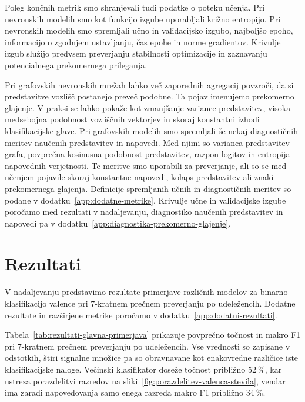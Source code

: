 Poleg končnih metrik smo shranjevali tudi podatke o poteku učenja.
Pri nevronskih modelih smo kot funkcijo izgube uporabljali križno entropijo.
Pri nevronskih modelih smo spremljali učno in validacijsko izgubo, najboljšo epoho, informacijo o zgodnjem ustavljanju, čas epohe in norme gradientov.
Krivulje izgub služijo predvsem preverjanju stabilnosti optimizacije in zaznavanju potencialnega prekomernega prileganja.

Pri grafovskih nevronskih mrežah lahko več zaporednih agregacij povzroči, da si predstavitve vozlišč postanejo preveč podobne.
Ta pojav imenujemo prekomerno glajenje.
V praksi se lahko pokaže kot zmanjšanje variance predstavitev, visoka medsebojna podobnost vozliščnih vektorjev in skoraj konstantni izhodi klasifikacijske glave.
Pri grafovskih modelih smo spremljali še nekaj diagnostičnih meritev naučenih predstavitev in napovedi.
Med njimi so varianca predstavitev grafa, povprečna kosinusna podobnost predstavitev, razpon logitov in entropija napovednih verjetnosti.
Te meritve smo uporabili za preverjanje, ali so se med učenjem pojavile skoraj konstantne napovedi, kolaps predstavitev ali znaki prekomernega glajenja.
Definicije spremljanih učnih in diagnostičnih meritev so podane v dodatku~\ref{app:dodatne-metrike}.
Krivulje učne in validacijske izgube poročamo med rezultati v nadaljevanju, diagnostiko naučenih predstavitev in napovedi pa v dodatku~\ref{app:diagnostika-prekomerno-glajenje}.
\newpage
\section{Rezultati}

V nadaljevanju predstavimo rezultate primerjave različnih modelov za binarno klasifikacijo valence pri 7-kratnem prečnem preverjanju po udeležencih.
Dodatne rezultate in razširjene metrike poročamo v dodatku~\ref{app:dodatni-rezultati}.


Tabela~\ref{tab:rezultati-glavna-primerjava} prikazuje povprečno točnost in makro F1 pri 7-kratnem prečnem preverjanju po udeležencih.
Vse vrednosti so zapisane v odstotkih, štiri signalne množice pa so obravnavane kot enakovredne različice iste klasifikacijske naloge.
Večinski klasifikator doseže točnost približno $52~\%$, kar ustreza porazdelitvi razredov na sliki~\ref{fig:porazdelitev-valenca-stevila}, vendar ima zaradi napovedovanja samo enega razreda makro F1 približno $34~\%$.

